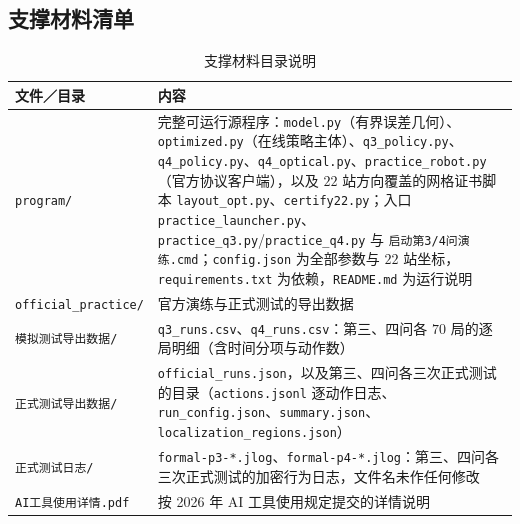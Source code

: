 \begin{appendices}

\renewcommand{\thesubsection}{\thesection.\arabic{subsection}}
\renewcommand{\thesubsubsection}{\thesubsection.\arabic{subsubsection}}

\section{支撑材料清单}

\begin{table}[!htbp]
  \caption{支撑材料目录说明}\centering\small
  \begin{tabularx}{\textwidth}{>{\raggedright\arraybackslash}p{4.6cm} L}
    \toprule[1.5pt]
    文件／目录 & 内容 \\
    \midrule[1pt]
    \texttt{program/} & 完整可运行源程序：\texttt{model.py}（有界误差几何）、\texttt{optimized.py}（在线策略主体）、\texttt{q3\_policy.py}、\texttt{q4\_policy.py}、\texttt{q4\_optical.py}、\texttt{practice\_robot.py}（官方协议客户端），以及 $22$ 站方向覆盖的网格证书脚本 \texttt{layout\_opt.py}、\texttt{certify22.py}；入口 \texttt{practice\_launcher.py}、\texttt{practice\_q3.py}/\texttt{practice\_q4.py} 与 \texttt{启动第3/4问演练.cmd}；\texttt{config.json} 为全部参数与 $22$ 站坐标，\texttt{requirements.txt} 为依赖，\texttt{README.md} 为运行说明 \\
    \texttt{official\_practice/} & 官方演练与正式测试的导出数据 \\
    \quad\texttt{模拟测试导出数据/} & \texttt{q3\_runs.csv}、\texttt{q4\_runs.csv}：第三、四问各 $70$ 局的逐局明细（含时间分项与动作数） \\
    \quad\texttt{正式测试导出数据/} & \texttt{official\_runs.json}，以及第三、四问各三次正式测试的目录（\texttt{actions.jsonl} 逐动作日志、\texttt{run\_config.json}、\texttt{summary.json}、\texttt{localization\_regions.json}） \\
    \quad\texttt{正式测试日志/} & \texttt{formal-p3-*.jlog}、\texttt{formal-p4-*.jlog}：第三、四问各三次正式测试的加密行为日志，文件名未作任何修改 \\
    \texttt{AI工具使用详情.pdf} & 按 2026 年 AI 工具使用规定提交的详情说明 \\
    \bottomrule[1.5pt]
  \end{tabularx}
\end{table}


\end{appendices}
